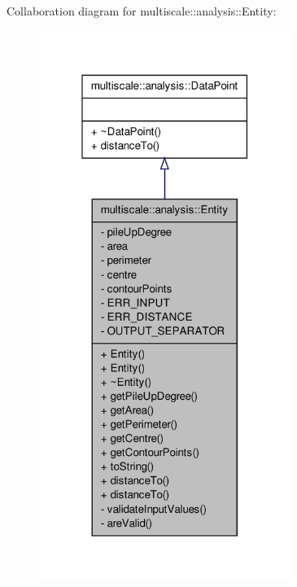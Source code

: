 \-Collaboration diagram for multiscale\-:\-:analysis\-:\-:\-Entity\-:
\nopagebreak
\begin{figure}[H]
\begin{center}
\leavevmode
\includegraphics[width=232pt]{classmultiscale_1_1analysis_1_1Entity__coll__graph}
\end{center}
\end{figure}
